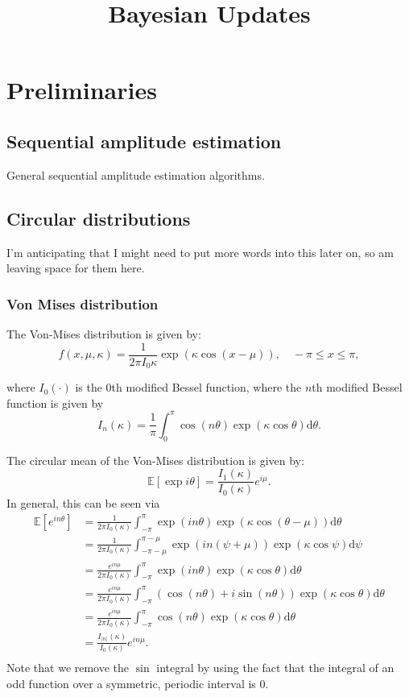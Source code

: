 \documentclass[]{report}
\title{Bayesian Updates}
\begin{document}
\maketitle
\chapter{Preliminaries}
\section{Sequential amplitude estimation}
General sequential amplitude estimation algorithms.
\section{Circular distributions}
I'm anticipating that I might need to put more words into this later on, so am leaving space for them here.

\subsection{Von Mises distribution}
The Von-Mises distribution is given by:
\[
f(x, \mu, \kappa) = \frac{1}{2 \pi I_0{\kappa}} \exp(\kappa \cos(x-\mu)), \quad - \pi \le x \le \pi,
\]

where $I_0(\cdot)$ is the $0$th modified Bessel function, where the $n$th modified Bessel function is given by
\[
I_{n}(\kappa) = \frac{1}{\pi} \int_0^\pi \cos(n\theta) \exp(\kappa \cos \theta) \text{d}\theta.
\]

The circular mean of the Von-Mises distribution is given by:
 \[
	 \mathbb{E}\left[ \exp i  \theta \right]   = \frac{I_1\left( \kappa \right) }{I_0 \left( \kappa \right) }e^{i \mu}
.\]
In general, this can be seen via
\begin{align*}
	\mathbb{E} [e^{i n \theta}] &= \frac{1}{2\pi I_0 \left( \kappa \right) }\int_{-\pi}^{\pi}\exp\left( in \theta \right) \exp\left( \kappa \cos( \theta - \mu) \right) \text{d}\theta\\
				    &= \frac{1}{2\pi I_0\left( \kappa \right) }\int_{-\pi - \mu}^{\pi - \mu}\exp(in (\psi + \mu)) \exp\left( \kappa \cos\psi  \right) \text{d}\psi \\
				    &= \frac{e^{in \mu} }{2\pi I_0\left( \kappa \right) }\int_{-\pi}^{\pi} \exp\left( i n \theta \right) \exp \left( \kappa \cos\theta  \right) \text{d}\theta \\
				    &= \frac{e^{in \mu}}{2\pi I_0 (\kappa)} \int_{- \pi}^{\pi} \left( \cos( n \theta) + i \sin (n \theta)  \right) \exp\left( \kappa \cos \theta \right) \text{d} \theta \\
				    &= \frac{e^{in \mu}}{2\pi I_0\left( \kappa \right) } \int_{-\pi}^{\pi} \cos\left( n\theta \right)  \exp \left( \kappa \cos \theta \right) \text{d}\theta \\
				    &= \frac{I_{|n|}(\kappa)}{I_0(\kappa)} e^{i n \mu}. \\
\end{align*}
Note that we remove the $\sin$ integral by using the fact that the integral of an odd function over a symmetric, periodic interval is $0$.
\end{document}
